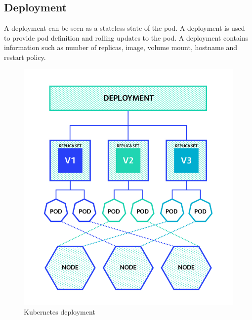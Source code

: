 \documentclass[12pt]{report}
\begin{document}
\subsection{Deployment}
A deployment can be seen as a stateless state of the pod. A deployment is used to provide pod definition and rolling updates to the pod. A deployment contains information such as number of replicas, image, volume mount, hostname and restart policy.\\
\begin{figure}[h!]
	\begin{center}
		\includegraphics[totalheight=0.45\textheight]{deploy}
		\caption{Kubernetes deployment \cite{Deployments}}
	\end{center}
\end{figure}
\end{document}
